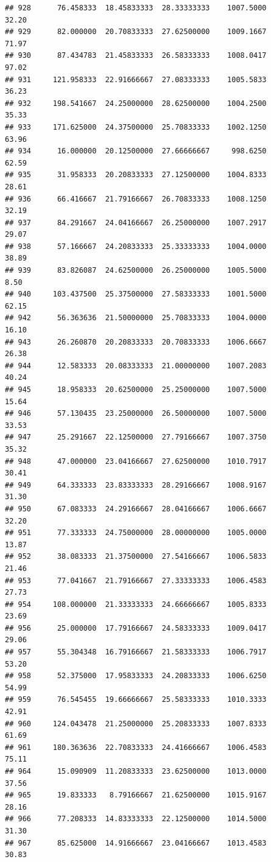 \documentclass[
]{article}
\begin{document}
\begin{verbatim}
## 928      76.458333  18.45833333  28.33333333    1007.5000       32.20
## 929      82.000000  20.70833333  27.62500000    1009.1667       71.97
## 930      87.434783  21.45833333  26.58333333    1008.0417       97.02
## 931     121.958333  22.91666667  27.08333333    1005.5833       36.23
## 932     198.541667  24.25000000  28.62500000    1004.2500       35.33
## 933     171.625000  24.37500000  25.70833333    1002.1250       63.96
## 934      16.000000  20.12500000  27.66666667     998.6250       62.59
## 935      31.958333  20.20833333  27.12500000    1004.8333       28.61
## 936      66.416667  21.79166667  26.70833333    1008.1250       32.19
## 937      84.291667  24.04166667  26.25000000    1007.2917       29.07
## 938      57.166667  24.20833333  25.33333333    1004.0000       38.89
## 939      83.826087  24.62500000  26.25000000    1005.5000        8.50
## 940     103.437500  25.37500000  27.58333333    1001.5000       62.15
## 942      56.363636  21.50000000  25.70833333    1004.0000       16.10
## 943      26.260870  20.20833333  20.70833333    1006.6667       26.38
## 944      12.583333  20.08333333  21.00000000    1007.2083       40.24
## 945      18.958333  20.62500000  25.25000000    1007.5000       15.64
## 946      57.130435  23.25000000  26.50000000    1007.5000       33.53
## 947      25.291667  22.12500000  27.79166667    1007.3750       35.32
## 948      47.000000  23.04166667  27.62500000    1010.7917       30.41
## 949      64.333333  23.83333333  28.29166667    1008.9167       31.30
## 950      67.083333  24.29166667  28.04166667    1006.6667       32.20
## 951      77.333333  24.75000000  28.00000000    1005.0000       13.87
## 952      38.083333  21.37500000  27.54166667    1006.5833       21.46
## 953      77.041667  21.79166667  27.33333333    1006.4583       27.73
## 954     108.000000  21.33333333  24.66666667    1005.8333       23.69
## 956      25.000000  17.79166667  24.58333333    1009.0417       29.06
## 957      55.304348  16.79166667  21.58333333    1006.7917       53.20
## 958      52.375000  17.95833333  24.20833333    1006.6250       54.99
## 959      76.545455  19.66666667  25.58333333    1010.3333       42.91
## 960     124.043478  21.25000000  25.20833333    1007.8333       61.69
## 961     180.363636  22.70833333  24.41666667    1006.4583       75.11
## 964      15.090909  11.20833333  23.62500000    1013.0000       37.56
## 965      19.833333   8.79166667  21.62500000    1015.9167       28.16
## 966      77.208333  14.83333333  22.12500000    1014.5000       31.30
## 967      85.625000  14.91666667  23.04166667    1013.4583       30.83

\end{verbatim}
\end{document}
